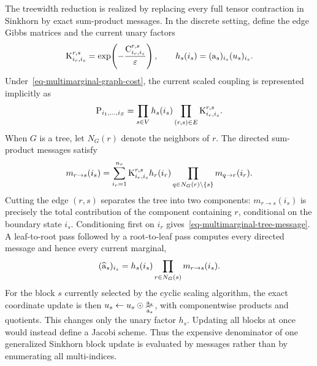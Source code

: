 The treewidth reduction is realized by replacing every full tensor contraction in Sinkhorn by exact sum-product messages. In the discrete setting, define the edge Gibbs matrices and the current unary factors
\[
	\mathrm{K}^{r,s}_{i_r,i_s}
	=
	\exp\!\left(-\frac{\mathrm{C}^{r,s}_{i_r,i_s}}{\varepsilon}\right),
	\qquad
	h_s(i_s)
	=
	(\mathrm{a}_s)_{i_s}(u_s)_{i_s}.
\]
Under~\eqref{eq-multimarginal-graph-cost}, the current scaled coupling is represented implicitly as
\begin{equation}\label{eq-multimarginal-graph-factorization}
	\mathrm{P}_{i_1,\ldots,i_S}
	=
	\prod_{s\in V}h_s(i_s)
	\prod_{(r,s)\in E}\mathrm{K}^{r,s}_{i_r,i_s}.
\end{equation}
When $G$ is a tree, let $N_G(r)$ denote the neighbors of $r$. The directed sum-product messages satisfy
\begin{equation}\label{eq-multimarginal-tree-message}
	m_{r\to s}(i_s)
	=
	\sum_{i_r=1}^{n_r}
	\mathrm{K}^{r,s}_{i_r,i_s}h_r(i_r)
	\prod_{q\in N_G(r)\setminus\{s\}}
	m_{q\to r}(i_r).
\end{equation}
Cutting the edge $(r,s)$ separates the tree into two components: $m_{r\to s}(i_s)$ is precisely the total contribution of the component containing $r$, conditional on the boundary state $i_s$. Conditioning first on $i_r$ gives~\eqref{eq-multimarginal-tree-message}. A leaf-to-root pass followed by a root-to-leaf pass computes every directed message and hence every current marginal,
\begin{equation}\label{eq-multimarginal-tree-marginal}
	(\widehat{\mathrm{a}}_s)_{i_s}
	=
	h_s(i_s)
	\prod_{r\in N_G(s)}m_{r\to s}(i_s).
\end{equation}
For the block $s$ currently selected by the cyclic scaling algorithm, the exact coordinate update is then
$u_s \leftarrow u_s\odot\frac{\mathrm{a}_s}{\widehat{\mathrm{a}}_s}$,
with componentwise products and quotients. This changes only the unary factor $h_s$. Updating all blocks at once would instead define a Jacobi scheme. Thus the expensive denominator of one generalized Sinkhorn block update is evaluated by messages rather than by enumerating all multi-indices.

